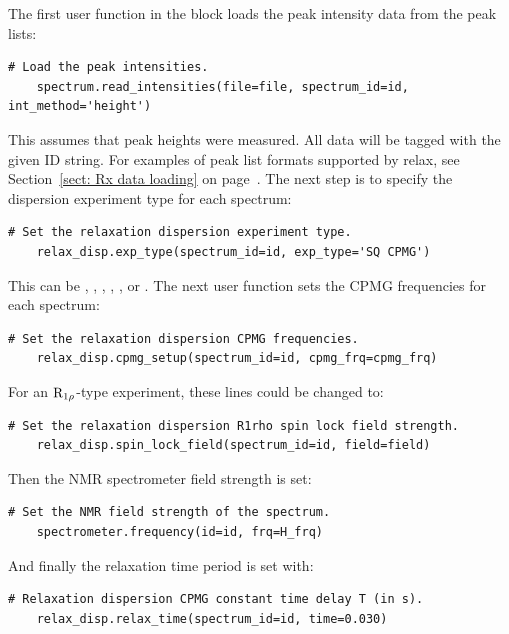 The first user function in the block loads the peak intensity data from the peak lists:

\begin{lstlisting}[firstnumber=96]
    # Load the peak intensities.
    spectrum.read_intensities(file=file, spectrum_id=id, int_method='height')
\end{lstlisting}

This assumes that peak heights were measured.
All data will be tagged with the given ID string.
For examples of peak list formats supported by relax, see Section~\ref{sect: Rx data loading} on page~\pageref{sect: Rx data loading}.
The next step is to specify the dispersion experiment type for each spectrum:

\begin{lstlisting}[firstnumber=99]
    # Set the relaxation dispersion experiment type.
    relax_disp.exp_type(spectrum_id=id, exp_type='SQ CPMG')
\end{lstlisting}

This can be , ,  ,  ,  ,  or .
The next user function sets the CPMG frequencies for each spectrum:

\begin{lstlisting}[firstnumber=102]
    # Set the relaxation dispersion CPMG frequencies.
    relax_disp.cpmg_setup(spectrum_id=id, cpmg_frq=cpmg_frq)
\end{lstlisting}

For an $\mathrm{R}_{1\rho}$-type experiment, these lines could be changed to:

\begin{lstlisting}[numbers=none]
    # Set the relaxation dispersion R1rho spin lock field strength.
    relax_disp.spin_lock_field(spectrum_id=id, field=field)
\end{lstlisting}

Then the NMR spectrometer field strength is set:

\begin{lstlisting}[firstnumber=105]
    # Set the NMR field strength of the spectrum.
    spectrometer.frequency(id=id, frq=H_frq)
\end{lstlisting}

And finally the relaxation time period is set with:

\begin{lstlisting}[firstnumber=108]
    # Relaxation dispersion CPMG constant time delay T (in s).
    relax_disp.relax_time(spectrum_id=id, time=0.030)
\end{lstlisting}

